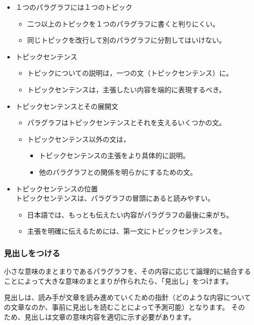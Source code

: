 \documentclass[12pt,a4paper]{jsarticle}
\begin{document}
\begin{itemize}
\item
１つのパラグラフには１つのトピック
	\begin{itemize}
	\item
	二つ以上のトピックを１つのパラグラフに書くと判りにくい。
	\item
	同じトピックを改行して別のパラグラフに分割してはいけない。
	\end{itemize}	
\item
トピックセンテンス
	\begin{itemize}
	\item
	トピックについての説明は，一つの文（トピックセンテンス）に。
	\item
	トピックセンテンスは，主張したい内容を端的に表現するべき。
	\end{itemize}
\item
トピックセンテンスとその展開文
	\begin{itemize}
	\item
	パラグラフはトピックセンテンスとそれを支えるいくつかの文。
	\item
	トピックセンテンス以外の文は，
		\begin{itemize}
		\item
		トピックセンテンスの主張をより具体的に説明。
		\item
		他のパラグラフとの関係を明らかにするための文。
		\end{itemize}
	\end{itemize}
\item
トピックセンテンスの位置\\
トピックセンテンスは、パラグラフの冒頭にあると読みやすい。
	\begin{itemize}
	\item
	日本語では、もっとも伝えたい内容がパラグラフの最後に来がち。
	\item
	主張を明確に伝えるためには、第一文にトピックセンテンスを。
	\end{itemize}
\end{itemize}

\subsubsection{見出しをつける}

小さな意味のまとまりであるパラグラフを、その内容に応じて論理的に結合することによって大きな意味のまとまりが作られたら、「見出し」をつけます。

見出しは、読み手が文章を読み進めていくための指針（どのような内容についての文章なのか、事前に見出しを読むことによって予測可能）となります。
そのため、見出しは文章の意味内容を適切に示す必要があります。
\end{document}
